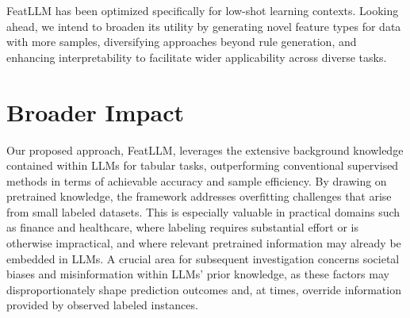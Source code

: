 \textsf{FeatLLM} has been optimized specifically for low-shot learning contexts. Looking ahead, we intend to broaden its utility by generating novel feature types for data with more samples, diversifying approaches beyond rule generation, and enhancing interpretability to facilitate wider applicability across diverse tasks.

\section{Broader Impact} Our proposed approach, \textsf{FeatLLM}, leverages the extensive background knowledge contained within LLMs for tabular tasks, outperforming conventional supervised methods in terms of achievable accuracy and sample efficiency. By drawing on pretrained knowledge, the framework addresses overfitting challenges that arise from small labeled datasets. This is especially valuable in practical domains such as finance and healthcare, where labeling requires substantial effort or is otherwise impractical, and where relevant pretrained information may already be embedded in LLMs. A crucial area for subsequent investigation concerns societal biases and misinformation within LLMs' prior knowledge, as these factors may disproportionately shape prediction outcomes and, at times, override information provided by observed labeled instances.


